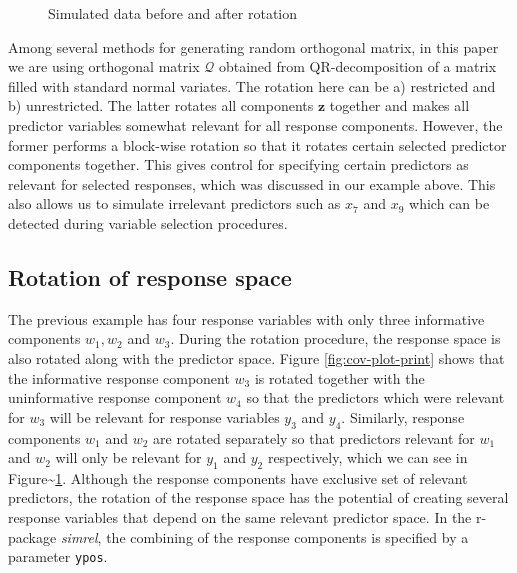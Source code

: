 \documentclass[review]{elsarticle}
\theoremstyle{definition}
\theoremstyle{definition}
\theoremstyle{definition}
\theoremstyle{remark}
\begin{document}
\begin{figure}[!htb]

{\centering {}

}

\caption{Simulated data before and after rotation}\label{fig:simulated-data}
\end{figure}

Among several methods
\citep{anderson1987generation, heiberger1978algorithm} for generating
random orthogonal matrix, in this paper we are using orthogonal matrix
\(\mathcal{Q}\) obtained from QR-decomposition of a matrix filled with
standard normal variates. The rotation here can be a) restricted and b)
unrestricted. The latter rotates all components \(\mathbf{z}\) together
and makes all predictor variables somewhat relevant for all response
components. However, the former performs a block-wise rotation so that
it rotates certain selected predictor components together. This gives
control for specifying certain predictors as relevant for selected
responses, which was discussed in our example above. This also allows us
to simulate irrelevant predictors such as \(x_{7}\) and \(x_{9}\) which
can be detected during variable selection procedures.

\hypertarget{rotation-of-response-space}{\subsection{Rotation of
response space}\label{rotation-of-response-space}}

The previous example has four response variables with only three
informative components \(w_1, w_2\) and \(w_3\). During the rotation
procedure, the response space is also rotated along with the predictor
space. Figure \ref{fig:cov-plot-print} shows that the informative
response component \(w_3\) is rotated together with the uninformative
response component \(w_4\) so that the predictors which were relevant
for \(w_3\) will be relevant for response variables \(y_3\) and \(y_4\).
Similarly, response components \(w_1\) and \(w_2\) are rotated
separately so that predictors relevant for \(w_1\) and \(w_2\) will only
be relevant for \(y_1\) and \(y_2\) respectively, which we can see in
Figure\textasciitilde{}\ref{fig:simulated-data}. Although the response
components have exclusive set of relevant predictors, the rotation of
the response space has the potential of creating several response
variables that depend on the same relevant predictor space. In the
r-package \emph{simrel}, the combining of the response components is
specified by a parameter \texttt{ypos}.
\end{document}
